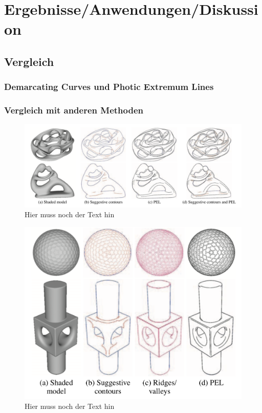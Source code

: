 \documentclass{paperStyle}
\begin{document}
\section{Ergebnisse/Anwendungen/Diskussion}
\subsection{Vergleich}
\subsubsection{Demarcating Curves und Photic Extremum Lines}
\subsubsection{Vergleich mit anderen Methoden}
\begin{figure}
	\centering
		\includegraphics[width=0.7\linewidth]{vglpel.png}
	\caption{Hier muss noch der Text hin}
\end{figure}
\begin{figure}
	\centering
		\includegraphics[width=0.9\linewidth]{vglpel2.png}
	\caption{Hier muss noch der Text hin}
\end{figure}
\end{document}
